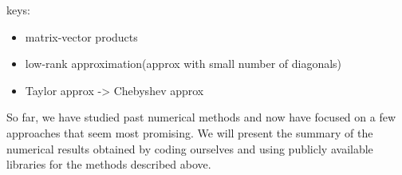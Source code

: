 keys:
\begin{itemize}
  \item matrix-vector products
  \item low-rank approximation(approx with small number of diagonals)
  \item Taylor approx -> Chebyshev approx
\end{itemize}




So far, we have studied past numerical methods and now have focused on a few approaches that seem most promising.
We will present the summary of the numerical results obtained by coding ourselves and using publicly available libraries for the methods described above.

